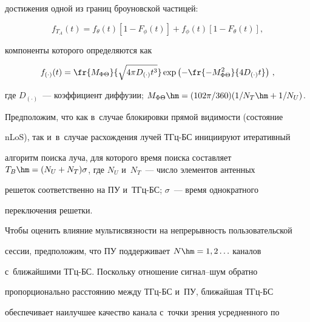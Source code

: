 до\-сти\-же\-ния одной из границ броуновской час\-ти\-цей:


  \begin{equation*}


  f_{T_A}(t)=f_\theta(t)\left[ 1-F_\phi(t)\right] +f_\phi(t) \left[ 1-F_\theta(t)\right],




  \end{equation*}


компоненты которого определяются как


  \begin{equation*}


  f_{(\cdot)}(t)=\fr{M_{\Phi\Theta}}{\sqrt{4\pi D_{(\cdot)} t^3}}\exp \left( -\fr{-


M^2_{\Phi\Theta}}{4D_{(\cdot)} t}\right)\,,




  \end{equation*}


где $ D_{(\cdot)}$~--- коэффициент диффузии; $M_{\Phi\Theta}\hm= 


(102\pi/360)(1/N_T\hm+1/N_U)$.


  


  Предположим, что как в~случае блокировки прямой видимости (со\-сто\-яние 


nLoS), так и~в~случае рас\-хож\-де\-ния лучей ТГц-БС ини\-ци\-иру\-ют итеративный 


алгоритм поиска луча, для которого время поиска со\-став\-ля\-ет $T_B\hm= 


(N_U+N_T)\sigma$, где $N_U$ и~$N_T$~--- чис\-ло элементов антенных 


решеток соответственно на ПУ и~ТГц-БС; $\sigma$~--- время однократного 


переключения решетки.


  


  Чтобы оценить влияние муль\-ти\-связ\-ности на непрерывность пользовательской 


сессии, предположим, что ПУ поддерживает $N\hm=1,2\ldots$ каналов 


с~ближайшими ТГц-БС. Поскольку отношение сиг\-нал--шум обратно 


пропорционально рас\-сто\-янию между ТГц-БС и~ПУ, ближайшая ТГц-БС 


обеспечивает наилучшее качество канала с~точ\-ки зрения усредненного по 


